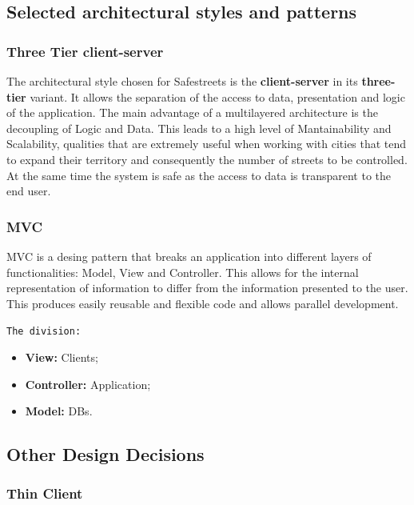 \subsection{Selected architectural styles and patterns}

\subsubsection{Three Tier client-server}

The architectural style chosen for Safestreets is the 
\textbf{client-server} in its \textbf{three-tier} variant.  
It allows the separation of the access to data, 
presentation and logic of the application.
The main advantage of a multilayered architecture 
is the decoupling of Logic and Data. This leads to a high 
level of Mantainability and Scalability, 
qualities that are extremely useful when working with 
cities that tend to expand their territory and consequently 
the number of streets to be controlled.
At the same time the system is safe as the access to data 
is transparent to the end user.

\subsubsection{MVC}

MVC is a desing pattern that breaks an application into 
different layers of functionalities: Model, View and 
Controller.
This allows for the internal representation of 
information to differ from the information presented 
to the user. 
This produces easily reusable and flexible code 
and allows parallel development. 

\texttt{The division:}

\begin{itemize}
    \item \textbf{View:} Clients;
    \item \textbf{Controller:} Application;
    \item \textbf{Model:} DBs.
    
    
\end{itemize}

\subsection{Other Design Decisions}

\subsubsection{Thin Client}

